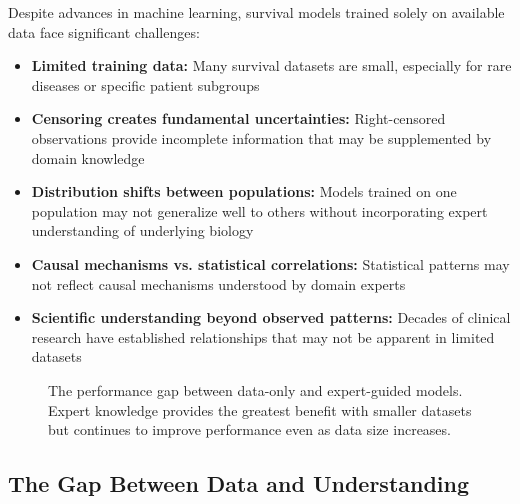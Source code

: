 Despite advances in machine learning, survival models trained solely on available data face significant challenges:

\begin{itemize}
    \item \textbf{Limited training data:} Many survival datasets are small, especially for rare diseases or specific patient subgroups
    \item \textbf{Censoring creates fundamental uncertainties:} Right-censored observations provide incomplete information that may be supplemented by domain knowledge
    \item \textbf{Distribution shifts between populations:} Models trained on one population may not generalize well to others without incorporating expert understanding of underlying biology
    \item \textbf{Causal mechanisms vs. statistical correlations:} Statistical patterns may not reflect causal mechanisms understood by domain experts
    \item \textbf{Scientific understanding beyond observed patterns:} Decades of clinical research have established relationships that may not be apparent in limited datasets
\end{itemize}

\begin{figure}[htbp]
    \centering
    \caption{The performance gap between data-only and expert-guided models. Expert knowledge provides the greatest benefit with smaller datasets but continues to improve performance even as data size increases.}
    \label{fig:expert-knowledge-impact}
\end{figure}

\subsection{The Gap Between Data and Understanding}

